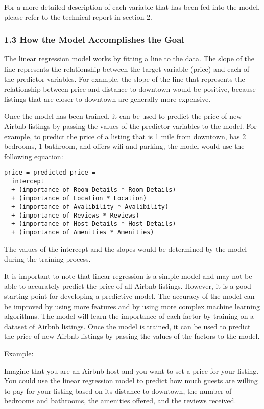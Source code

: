 \documentclass[
  letterpaper,
  DIV=11,
  numbers=noendperiod]{scrartcl}
\begin{document}
For a more detailed description of each variable that has been fed into
the model, please refer to the technical report in section 2.

\hypertarget{how-the-model-accomplishes-the-goal}{%
\subsubsection{1.3 How the Model Accomplishes the
Goal}\label{how-the-model-accomplishes-the-goal}}

The linear regression model works by fitting a line to the data. The
slope of the line represents the relationship between the target
variable (price) and each of the predictor variables. For example, the
slope of the line that represents the relationship between price and
distance to downtown would be positive, because listings that are closer
to downtown are generally more expensive.

Once the model has been trained, it can be used to predict the price of
new Airbnb listings by passing the values of the predictor variables to
the model. For example, to predict the price of a listing that is 1 mile
from downtown, has 2 bedrooms, 1 bathroom, and offers wifi and parking,
the model would use the following equation:

\begin{verbatim}
price = predicted_price = 
  intercept 
  + (importance of Room Details * Room Details) 
  + (importance of Location * Location) 
  + (importance of Avalibility * Avalibility) 
  + (importance of Reviews * Reviews) 
  + (importance of Host Details * Host Details)
  + (importance of Amenities * Amenities)
\end{verbatim}

The values of the intercept and the slopes would be determined by the
model during the training process.

It is important to note that linear regression is a simple model and may
not be able to accurately predict the price of all Airbnb listings.
However, it is a good starting point for developing a predictive model.
The accuracy of the model can be improved by using more features and by
using more complex machine learning algorithms. The model will learn the
importance of each factor by training on a dataset of Airbnb listings.
Once the model is trained, it can be used to predict the price of new
Airbnb listings by passing the values of the factors to the model.

Example:

Imagine that you are an Airbnb host and you want to set a price for your
listing. You could use the linear regression model to predict how much
guests are willing to pay for your listing based on its distance to
downtown, the number of bedrooms and bathrooms, the amenities offered,
and the reviews received.
\end{document}
